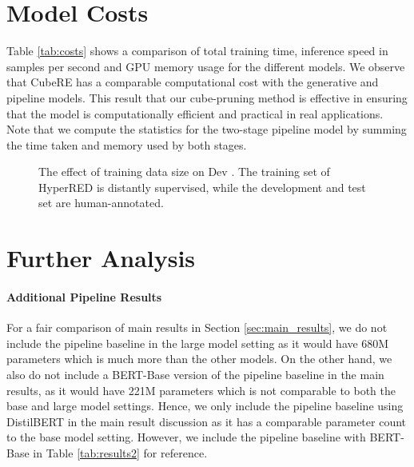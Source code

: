 \documentclass[11pt]{article}
\newcommand{\modelname}{CubeRE}
\begin{document}
\section{Model Costs}
\label{sec:efficiency}
Table \ref{tab:costs} shows a comparison of total training time, inference speed in samples per second and GPU memory usage for the different models. We observe that \modelname{} has a comparable computational cost with the generative and pipeline models. 
This result that our cube-pruning method is effective in ensuring that the model is computationally efficient and practical in real applications.
Note that we compute the statistics for the two-stage pipeline model by summing the time taken and memory used by both stages.


\begin{figure}
\centering
{}
\caption{
The effect of training data size on Dev . 
The training set of HyperRED is distantly supervised, while the development and test set are human-annotated.\vspace{-3mm}}
\label{fig:data_size}
\end{figure}

\section{Further Analysis}
\label{sec:further}
\paragraph{Additional Pipeline Results}
For a fair comparison of main results in Section \ref{sec:main_results}, we do not include the pipeline baseline in the large model setting as it would have 680M parameters which is much more than the other models.
On the other hand, we also do not include a BERT-Base version of the pipeline baseline in the main results, as it would have 221M parameters which is not comparable to both the base and large model settings.
Hence, we only include the pipeline baseline using DistilBERT in the main result discussion as it has a comparable parameter count to the base model setting.
However, we include the pipeline baseline with BERT-Base in Table \ref{tab:results2} for reference.
\end{document}

